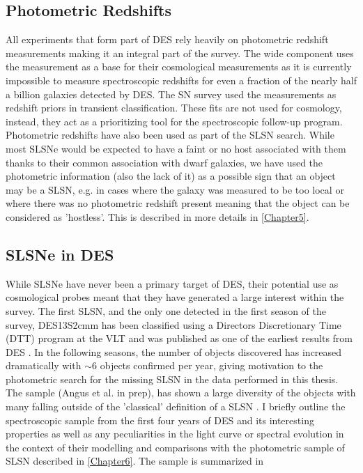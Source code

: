 \subsection{Photometric Redshifts}
All experiments that form part of DES rely heavily on photometric redshift measurements making it an integral part of the survey. The wide component uses the measurement as a base for their cosmological measurements as it is currently impossible to measure spectroscopic redshifts for even a fraction of the nearly half a billion galaxies detected by DES. The SN survey used the measurements as redshift priors in transient classification. These fits are not used for cosmology, instead, they act as a prioritizing tool for the spectroscopic follow-up program. Photometric redshifts have also been used as part of the SLSN search. While most SLSNe would be expected to have a faint or no host associated with them thanks to their common association with dwarf galaxies, we have used the photometric information (also the lack of it) as a possible sign that an object may be a SLSN, e.g. in cases where the galaxy was measured to be too local or where there was no photometric redshift present meaning that the object can be considered as 'hostless'. This is described in more details in \cref{Chapter5}.

\subsection{SLSNe in DES}
\label{sec:DES_SLSN}
While SLSNe have never been a primary target of DES, their potential use as cosmological probes \citep{Inserra2014} meant that they have generated a large interest within the survey. The first SLSN, and the only one detected in the first season of the survey, DES13S2cmm has been classified using a Directors Discretionary Time (DTT) program at the VLT and was published as one of the earliest results from DES \cite{Papadopoulos2015}. In the following seasons, the number of objects discovered has increased dramatically with $\sim$6 objects confirmed per year, giving motivation to the photometric search for the missing SLSN in the data performed in this thesis. The sample (Angus et al. in prep), has shown a large diversity of the objects with many falling outside of the 'classical' definition of a SLSN \citep{Inserra2018}. I briefly outline the spectroscopic sample from the first four years of DES and its interesting properties as well as any peculiarities in the light curve or spectral evolution in the context of their modelling and comparisons with the photometric sample of SLSN described in \cref{Chapter6}. The sample is summarized in 


